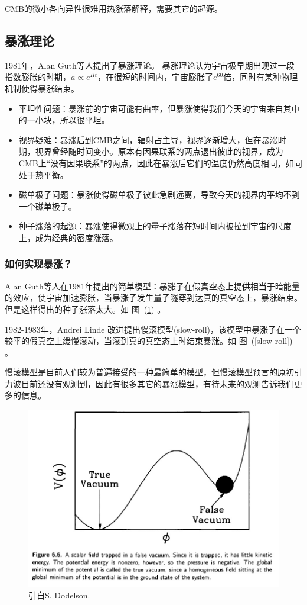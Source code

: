 \documentclass[12pt]{ctexart}
\newcommand{\reffig}[1]{图~(\ref{#1})}
\begin{document}
CMB的微小各向异性很难用热涨落解释，需要其它的起源。

\subsection{暴涨理论}

1981年，Alan Guth等人提出了暴涨理论。
暴涨理论认为宇宙极早期出现过一段指数膨胀的时期，$a\propto e^{Ht}$，在很短的时间内，宇宙膨胀了$e^{60}$倍，同时有某种物理机制使得暴涨结束。

\begin{itemize}
    \item 平坦性问题：暴涨前的宇宙可能有曲率，但暴涨使得我们今天的宇宙来自其中的一小块，所以很平坦。
    \item 视界疑难：暴涨后到CMB之间，辐射占主导，视界逐渐增大，但在暴涨时期，视界曾经随时间变小。原本有因果联系的两点退出彼此的视界，成为CMB上“没有因果联系”的两点，因此在暴涨后它们的温度仍然高度相同，如同处于热平衡。
    \item 磁单极子问题：暴涨使得磁单极子彼此急剧远离，导致今天的视界内平均不到一个磁单极子。
    \item 种子涨落的起源：暴涨使得微观上的量子涨落在短时间内被拉到宇宙的尺度上，成为经典的密度涨落。
\end{itemize}

\subsubsection*{如何实现暴涨？}

Alan Guth等人在1981年提出的简单模型：暴涨子在假真空态上提供相当于暗能量的效应，使宇宙加速膨胀，当暴涨子发生量子隧穿到达真的真空态上，暴涨结束。但是这样得出的种子涨落太大。如 \reffig{suichuan} 。

1982-1983年，Andrei Linde 改进提出慢滚模型(slow-roll)，该模型中暴涨子在一个较平的假真空上缓慢滚动，当滚到真的真空态上时结束暴涨。如  \reffig{slow-roll} 。

慢滚模型是目前人们较为普遍接受的一种最简单的模型，但慢滚模型预言的原初引力波目前还没有观测到，因此有很多其它的暴涨模型，有待未来的观测告诉我们更多的信息。

\begin{figure}[!hbtp]
	\centering
	\includegraphics[width=1.0\linewidth]{suichuan.jpg}
	\caption{引自S. Dodelson.} \label{suichuan}
\end{figure}
\end{document}
